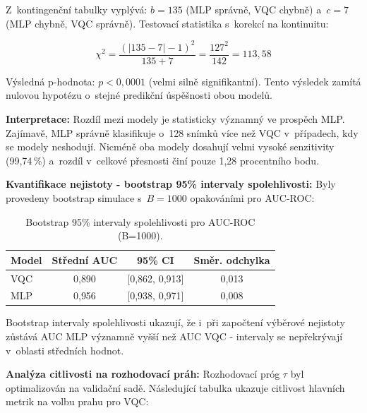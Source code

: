 \documentclass[12pt, a4paper]{report}
\begin{document}
Z~kontingenční tabulky vyplývá: $b = 135$ (MLP správně, VQC chybně) a~$c = 7$ (MLP chybně, VQC správně). Testovací statistika s~korekcí na kontinuitu:

\begin{equation}
    \chi^2 = \frac{(|135 - 7| - 1)^2}{135 + 7} = \frac{127^2}{142} = 113{,}58
\end{equation}

Výsledná p-hodnota: $p < 0{,}0001$ (velmi silně signifikantní). Tento výsledek zamítá nulovou hypotézu o~stejné predikční úspěšnosti obou modelů.

\textbf{Interpretace:} Rozdíl mezi modely je statisticky významný ve prospěch MLP. Zajímavě, MLP správně klasifikuje o~128 snímků více než VQC v~případech, kdy se modely neshodují. Nicméně oba modely dosahují velmi vysoké senzitivity (99,74\,\%) a~rozdíl v~celkové přesnosti činí pouze 1,28 procentního bodu.

\textbf{Kvantifikace nejistoty - bootstrap 95\% intervaly spolehlivosti:}
Byly provedeny bootstrap simulace s~$B = 1000$ opakováními pro AUC-ROC:

\begin{table}[htbp]
    \centering
    \caption{Bootstrap 95\% intervaly spolehlivosti pro AUC-ROC (B=1000).}
    \label{tab:bootstrap_ci}
    \begin{tabular}{|l|c|c|c|}
        \hline
        \textbf{Model} & \textbf{Střední AUC} & \textbf{95\% CI} & \textbf{Směr. odchylka} \\
        \hline
        VQC & 0{,}890 & [0{,}862, 0{,}913] & 0{,}013 \\
        \hline
        MLP & 0{,}956 & [0{,}938, 0{,}971] & 0{,}008 \\
        \hline
    \end{tabular}
\end{table}

Bootstrap intervaly spolehlivosti ukazují, že i~při započtení výběrové nejistoty zůstává AUC MLP významně vyšší než AUC VQC - intervaly se nepřekrývají v~oblasti středních hodnot.

\textbf{Analýza citlivosti na rozhodovací práh:}
Rozhodovací próg $\tau$ byl optimalizován na validační sadě. Následující tabulka ukazuje citlivost hlavních metrik na volbu prahu pro VQC:
\end{document}
